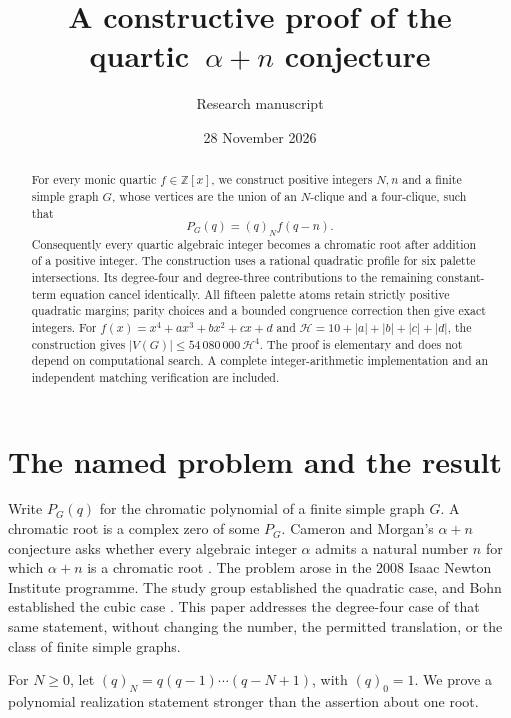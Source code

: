 \documentclass[11pt,a4paper]{article}
\title{\color{ink}\bfseries A constructive proof of the quartic~\texorpdfstring{\boldmath $\alpha+n$}{alpha+n} conjecture}
\author{\normalsize Research manuscript}
\date{28 November 2026}
\theoremstyle{definition}
\newcommand{\Z}{\mathbb Z}
\newcommand{\fall}[2]{(#1)_{#2}}
\newcommand{\htf}{\mathcal H}
\begin{document}
\maketitle
\begin{abstract}
For every monic quartic $f\in\Z[x]$, we construct positive integers $N,n$
and a finite simple graph $G$, whose vertices are the union of an $N$-clique
and a four-clique, such that
\[
 P_G(q)=\fall qN f(q-n).
\]
Consequently every quartic algebraic integer becomes a chromatic root after
addition of a positive integer. The construction uses a rational quadratic
profile for six palette intersections. Its degree-four and degree-three
contributions to the remaining constant-term equation cancel identically.
All fifteen palette atoms retain strictly positive quadratic margins;
parity choices and a bounded congruence correction then give exact integers.
For $f(x)=x^4+ax^3+bx^2+cx+d$ and
$\htf=10+|a|+|b|+|c|+|d|$, the construction gives
$|V(G)|\le 54\,080\,000\,\htf^4$.
The proof is elementary and does not depend on computational search.
A complete integer-arithmetic implementation and an independent matching
verification are included.
\end{abstract}

\section{The named problem and the result}

Write $P_G(q)$ for the chromatic polynomial of a finite simple graph $G$.
A chromatic root is a complex zero of some $P_G$. Cameron and Morgan's
$\alpha+n$ conjecture asks whether every algebraic integer $\alpha$ admits
a natural number $n$ for which $\alpha+n$ is a chromatic root
\cite[Conjecture 4]{CM}. The problem arose in the 2008 Isaac Newton
Institute programme. The study group established the quadratic case,
and Bohn established the cubic case \cite{CM,Bohn}. This paper addresses the degree-four case of that same
statement, without changing the number, the permitted translation, or the
class of finite simple graphs.

For $N\ge0$, let $\fall qN=q(q-1)\cdots(q-N+1)$, with
$\fall q0=1$. We prove a polynomial realization statement stronger than
the assertion about one root.
\end{document}
